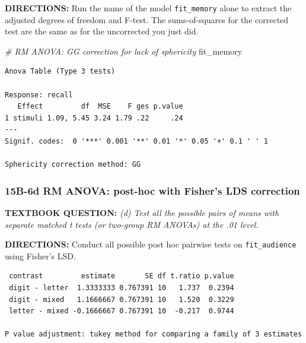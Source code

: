\documentclass[]{article}
\newenvironment{Shaded}{\begin{snugshade}}{\end{snugshade}}
\newcommand{\KeywordTok}[1]{\textcolor[rgb]{0.13,0.29,0.53}{\textbf{#1}}}
\newcommand{\DataTypeTok}[1]{\textcolor[rgb]{0.13,0.29,0.53}{#1}}
\newcommand{\StringTok}[1]{\textcolor[rgb]{0.31,0.60,0.02}{#1}}
\newcommand{\CommentTok}[1]{\textcolor[rgb]{0.56,0.35,0.01}{\textit{#1}}}
\newcommand{\OperatorTok}[1]{\textcolor[rgb]{0.81,0.36,0.00}{\textbf{#1}}}
\newcommand{\NormalTok}[1]{#1}
\begin{document}
\textbf{DIRECTIONS:} Run the name of the model \texttt{fit\_memory}
alone to extract the adjusted degrees of freedom and F-test. The
sums-of-squares for the corrected test are the same as for the
uncorrected you just did.

\begin{Shaded}
\begin{Highlighting}[]
\CommentTok{# RM ANOVA: GG correction for lack of sphericity}
\NormalTok{fit_memory }
\end{Highlighting}
\end{Shaded}

\begin{verbatim}
Anova Table (Type 3 tests)

Response: recall
   Effect         df  MSE    F ges p.value
1 stimuli 1.09, 5.45 3.24 1.79 .22     .24
---
Signif. codes:  0 '***' 0.001 '**' 0.01 '*' 0.05 '+' 0.1 ' ' 1

Sphericity correction method: GG 
\end{verbatim}

\clearpage

\subsubsection{15B-6d RM ANOVA: post-hoc with Fisher's LDS
correction}\label{b-6d-rm-anova-post-hoc-with-fishers-lds-correction}

\textbf{TEXTBOOK QUESTION:} \emph{(d) Test all the possible pairs of
means with separate matched t tests (or two-group RM ANOVAs) at the .01
level.}

\textbf{DIRECTIONS:} Conduct all possible post hoc pairwise tests on
\texttt{fit\_audience} using Fisher's LSD.

\begin{Shaded}
\end{Shaded}

\begin{verbatim}
 contrast         estimate       SE df t.ratio p.value
 digit - letter  1.3333333 0.767391 10   1.737  0.2394
 digit - mixed   1.1666667 0.767391 10   1.520  0.3229
 letter - mixed -0.1666667 0.767391 10  -0.217  0.9744

P value adjustment: tukey method for comparing a family of 3 estimates 
\end{verbatim}
\end{document}
